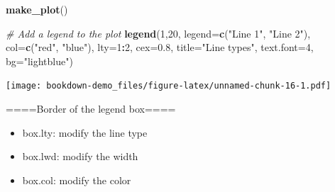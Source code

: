 \documentclass[]{book}
\newenvironment{Shaded}{\begin{snugshade}}{\end{snugshade}}
\newcommand{\KeywordTok}[1]{\textcolor[rgb]{0.13,0.29,0.53}{\textbf{#1}}}
\newcommand{\DataTypeTok}[1]{\textcolor[rgb]{0.13,0.29,0.53}{#1}}
\newcommand{\DecValTok}[1]{\textcolor[rgb]{0.00,0.00,0.81}{#1}}
\newcommand{\FloatTok}[1]{\textcolor[rgb]{0.00,0.00,0.81}{#1}}
\newcommand{\StringTok}[1]{\textcolor[rgb]{0.31,0.60,0.02}{#1}}
\newcommand{\CommentTok}[1]{\textcolor[rgb]{0.56,0.35,0.01}{\textit{#1}}}
\newcommand{\OperatorTok}[1]{\textcolor[rgb]{0.81,0.36,0.00}{\textbf{#1}}}
\newcommand{\NormalTok}[1]{#1}
\begin{document}
\begin{Shaded}
\begin{Highlighting}[]
\KeywordTok{make_plot}\NormalTok{()}

\CommentTok{# Add a legend to the plot}
\KeywordTok{legend}\NormalTok{(}\DecValTok{1}\NormalTok{,}\DecValTok{20}\NormalTok{, }\DataTypeTok{legend=}\KeywordTok{c}\NormalTok{(}\StringTok{"Line 1"}\NormalTok{, }\StringTok{"Line 2"}\NormalTok{),}
       \DataTypeTok{col=}\KeywordTok{c}\NormalTok{(}\StringTok{"red"}\NormalTok{, }\StringTok{"blue"}\NormalTok{), }\DataTypeTok{lty=}\DecValTok{1}\OperatorTok{:}\DecValTok{2}\NormalTok{, }\DataTypeTok{cex=}\FloatTok{0.8}\NormalTok{,}
       \DataTypeTok{title=}\StringTok{"Line types"}\NormalTok{, }\DataTypeTok{text.font=}\DecValTok{4}\NormalTok{, }\DataTypeTok{bg=}\StringTok{"lightblue"}\NormalTok{)}
\end{Highlighting}
\end{Shaded}

\texttt{[image: bookdown-demo\_files/figure-latex/unnamed-chunk-16-1.pdf]}

====Border of the legend box====

\begin{itemize}
\item
  box.lty: modify the line type
\item
  box.lwd: modify the width
\item
  box.col: modify the color
\end{itemize}
\end{document}
